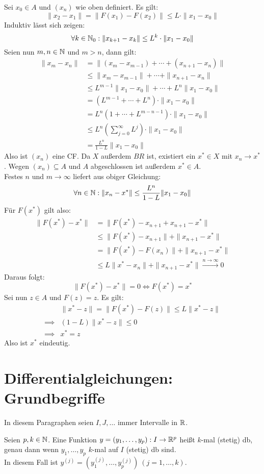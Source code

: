 \documentclass[a4paper,oneside,DIV15,BCOR12mm,chapterprefix=true,headings=onelinechapter]{scrbook}
\begin{document}
\begin{beweis}
Sei $x_0\in A$ und $(x_n)$ wie oben definiert. Es gilt:
\[\|x_2-x_1\|=\|F(x_1)-F(x_2)\|\le L\cdot \|x_1-x_0\|\]
Induktiv lässt sich zeigen:
\[\forall k\in\mathbb{N}_0: \|x_{k+1}-x_k\|\le L^k\cdot \|x_1-x_0\|\]
Seien nun $m,n\in\mathbb{N}$ und $m>n$, dann gilt:
\begin{align*}
\|x_m-x_n\| &= \|(x_m-x_{m-1})+\cdots+(x_{n+1}-x_n)\|\\
&\le \|x_m-x_{m-1}\|+\cdots+\|x_{n+1}-x_n\|\\
&\le L^{m-1}\|x_1-x_0\|+\cdots+L^n\|x_1-x_0\|\\
&=(L^{m-1}+\cdots+L^n)\cdot \|x_1-x_0\|\\
&= L^n(1+\cdots+L^{m-n-1})\cdot \|x_1-x_0\|\\
&\le L^n(\sum_{j=0}^\infty L^j)\cdot \|x_1-x_0\|\\
&= \frac{L^n}{1-L}\|x_1-x_0\|
\end{align*}
Also ist $(x_n)$ eine CF. Da $X$ außerdem $BR$ ist, existiert ein $x^*\in X$ mit
$x_n\to x^*$. Wegen $(x_n)\subseteq A$ und $A$ abgeschlossen ist außerdem $x^*\in A$.\\
Festes $n$ und $m\to\infty$ liefert aus obiger Gleichung:
\[\forall n\in\mathbb{N}:\|x_n-x^*\|\le \frac{L^n}{1-L}\|x_1-x_0\|\]
Für $F(x^*)$ gilt also:
\begin{align*}
\|F(x^*)-x^*\| &= \|F(x^*)-x_{n+1}+x_{n+1}-x^*\|\\
&\le \|F(x^*)-x_{n+1}\|+\|x_{n+1}-x^*\|\\
&=\|F(x^*)-F(x_n)\|+\|x_{n+1}-x^*\|\\
&\le L\|x^*-x_n\|+\|x_{n+1}-x^*\|\stackrel{n\to\infty}\to 0
\end{align*}
Daraus folgt:
\[\|F(x^*)-x^*\| = 0\iff F(x^*)=x^*\]
Sei nun $z\in A$ und $F(z)=z$. Es gilt:
\begin{align*}
&\|x^*-z\|=\|F(x^*)-F(z)\| \le L\|x^*-z\|\\
\implies &(1-L)\|x^*-z\| \le 0\\
\implies &x^*=z
\end{align*}
Also ist $x^*$ eindeutig.
\end{beweis}

\chapter{Differentialgleichungen: Grundbegriffe}
In diesem Paragraphen seien $I,J,\ldots$ immer Intervalle in $\mathbb{R}$.

\begin{erinnerung}
Seien $p,k\in\mathbb{N}$. Eine Funktion $y=(y_1,\ldots,y_p):I\to\mathbb{R}^p$ heißt
$k$-mal (stetig) db, genau dann wenn $y_1,\ldots,y_p$ $k$-mal auf $I$ (stetig)
db sind.\\
In diesem Fall ist $y^{(j)}=(y_1^{(j)},\ldots,y_p^{(j)})\ (j=1,\ldots,k)$.
\end{erinnerung}
\end{document}
